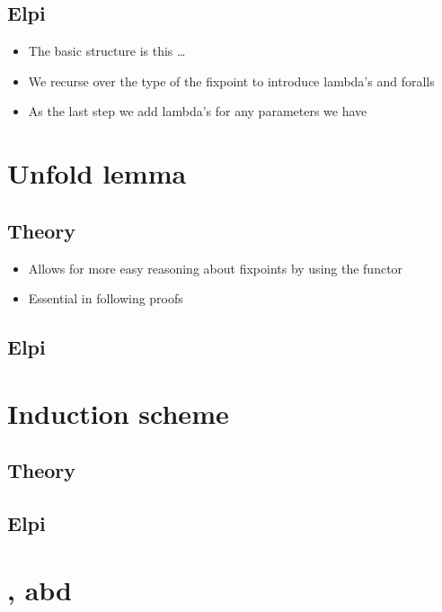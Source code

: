 \documentclass[thesis.tex]{subfiles}
\begin{document}
\subsection{Elpi}
\begin{itemize}
  \item The basic structure is this \dots
  \item We recurse over the type of the fixpoint to introduce lambda's and foralls
  \item As the last step we add lambda's for any parameters we have
\end{itemize}

\section{Unfold lemma}
\subsection{Theory}
\begin{itemize}
  \item Allows for more easy reasoning about fixpoints by using the functor
  \item Essential in following proofs
\end{itemize}
\subsection{Elpi}

\section{Induction scheme}
\subsection{Theory}
\subsection{Elpi}

\section[iConstructor, iDestruct, iInductive]{,  abd }
\end{document}
